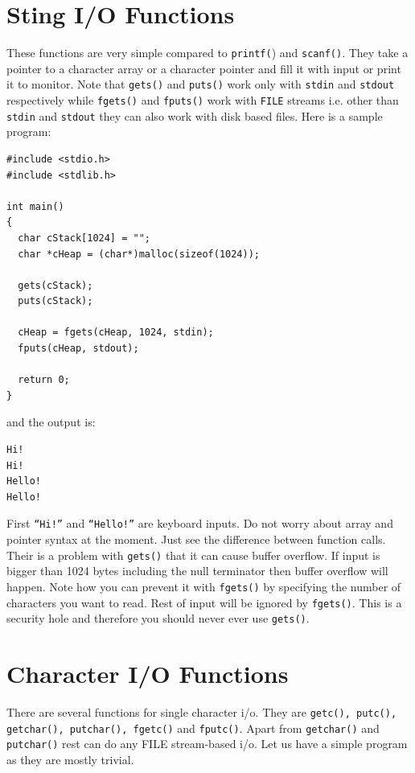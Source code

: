 \section{Sting I/O Functions}
These functions are very simple compared to \texttt{printf(}) and
\texttt{scanf()}. They take a pointer to a character array or a character
pointer and fill it with input or print it to monitor. Note that
\texttt{gets()} and \texttt{puts()} work only with \texttt{stdin} and
\texttt{stdout} respectively while \texttt{fgets()} and \texttt{fputs()} work
with \texttt{FILE} streams i.e. other than \texttt{stdin} and \texttt{stdout}
they can also work with disk based files. Here is a sample program:

\begin{verbatim}
#include <stdio.h>
#include <stdlib.h>

int main()
{
  char cStack[1024] = "";
  char *cHeap = (char*)malloc(sizeof(1024));

  gets(cStack);
  puts(cStack);

  cHeap = fgets(cHeap, 1024, stdin);
  fputs(cHeap, stdout);

  return 0;
}
\end{verbatim}

and the output is:

\begin{verbatim}
Hi!
Hi!
Hello!
Hello!
\end{verbatim}

First \texttt{``Hi!''} and \texttt{``Hello!''} are keyboard inputs. Do not
worry about array and pointer syntax at the moment. Just see the difference
between function calls. Their is a problem with \texttt{gets()} that it can
cause buffer overflow. If input is bigger than 1024 bytes including the null
terminator then buffer overflow will happen. Note how you can prevent it with
\texttt{fgets()} by specifying the number of characters you want to read. Rest
of input will be ignored by \texttt{fgets()}. This is a security hole and
therefore you should never ever use \texttt{gets()}.

\section{Character I/O Functions}
There are several functions for single character i/o. They are \texttt{getc(),
  putc(), getchar(), putchar(), fgetc()} and \texttt{fputc()}. Apart from
\texttt{getchar()} and \texttt{putchar()} rest can do any FILE stream-based
i/o. Let us have a simple program as they are mostly trivial.

